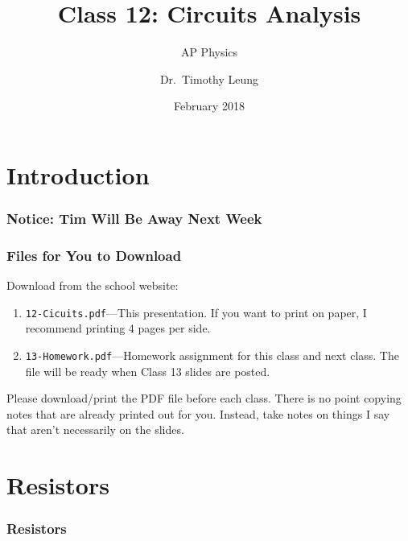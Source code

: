 \documentclass[12pt,aspectratio=169]{beamer}
\title{Class 12: Circuits Analysis}
\subtitle{AP Physics}
\author[TML]{Dr.\ Timothy Leung}
\institute{Olympiads School}
\date{February 2018}
\newcommand{\mb}[1]{\mathbf{#1}}
\newcommand{\eq}[2]{\vspace{#1}{\Large\begin{displaymath}#2\end{displaymath}}}
\begin{document}
\begin{frame}
  \maketitle
\end{frame}


\section[Intro]{Introduction}

\begin{frame}
  \frametitle{Notice: Tim Will Be Away Next Week}

  \begin{center}
  \end{center}
\end{frame}

\begin{frame}
  \frametitle{Files for You to Download}
  Download from the school website:
  \begin{enumerate}
  \item\texttt{12-Cicuits.pdf}---This presentation. If you want to print on
    paper, I recommend printing 4 pages per side.
  \item\texttt{13-Homework.pdf}---Homework assignment for this class and next
    class. The file will be ready when Class 13 slides are posted.
  \end{enumerate}

  \vspace{.2in}Please download/print the PDF file before each class. There is
  no point copying notes that are already printed out for you. Instead, take
  notes on things I say that aren't necessarily on the slides.
\end{frame}



\section{Resistors}

\begin{frame}
  \frametitle{Resistors}
%
%  
%
\end{frame}
\end{document}
